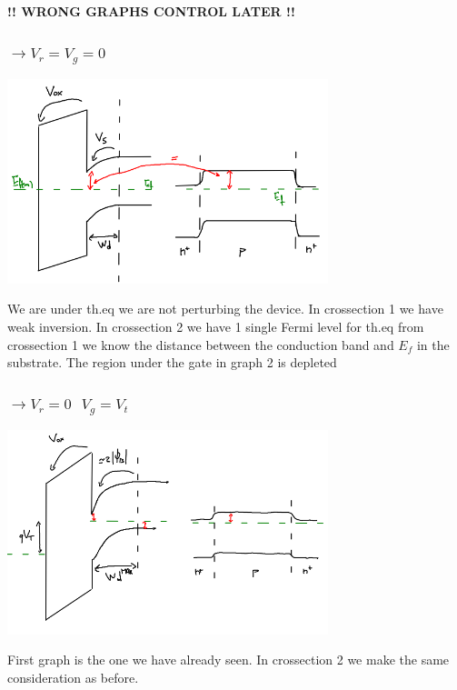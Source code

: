 {\bf !! WRONG GRAPHS CONTROL LATER  !!}

\subsubsection{$\rightarrow V_r=V_g=0$}

\centering
\includegraphics[width=0.7\textwidth]{theqmosr.png}\\
\raggedright

We are under th.eq we are not perturbing the device. In crossection 1 we have weak inversion. In crossection 2 we have 1 single Fermi level for th.eq from crossection 1 we know the distance between the conduction band and $E_f$ in the substrate. The region under the gate in graph 2 is depleted


\subsubsection{$\rightarrow V_r=0 \ \ \  V_g=V_t$}

\centering
\includegraphics[width=0.7\textwidth]{what1.png}\\
\raggedright

First graph is the one we have already seen. In crossection 2 we make the same consideration as before.


